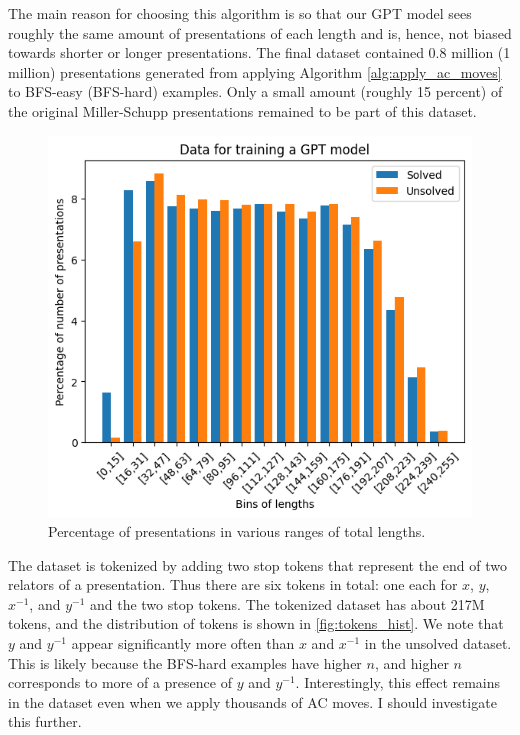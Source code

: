 The main reason for choosing this algorithm is so that our GPT model sees roughly the same amount of presentations of each length and is, hence, not biased towards shorter or longer presentations.
The final dataset contained 0.8 million (1 million) presentations generated from applying Algorithm \autoref{alg:apply_ac_moves} to BFS-easy (BFS-hard) examples.
Only a small amount (roughly 15 percent) of the original Miller-Schupp presentations remained to be part of this dataset.

\begin{figure}
	\centering
	\includegraphics[scale=0.6]{fig/gpt_data_length_distribution.png}
	\caption{Percentage of presentations in various ranges of total lengths.}
	\label{fig:gpt_data}
\end{figure}

The dataset is tokenized by adding two stop tokens that represent the end of two relators of a presentation.
Thus there are six tokens in total: one each for $x$, $y$, $x^{-1}$, and $y^{-1}$ and the two stop tokens.
The tokenized dataset has about 217M tokens, and the distribution of tokens is shown in \autoref{fig:tokens_hist}.
We note that $y$ and $y^{-1}$ appear significantly more often than $x$ and $x^{-1}$ in the unsolved dataset.
This is likely because the BFS-hard examples have higher $n$, and higher $n$ corresponds to more of a presence of $y$ and $y^{-1}$.
Interestingly, this effect remains in the dataset even when we apply thousands of AC moves.
I should investigate this further.

